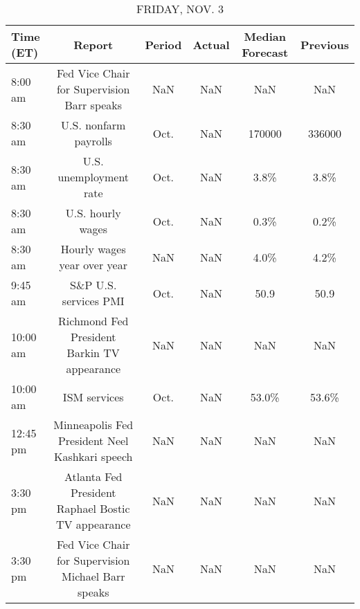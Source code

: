 \documentclass{article}%
\begin{document}
%


\begin{table}[htbp]%
\caption{FRIDAY, NOV. 3}%
\centering%
\begin{adjustbox}{width=1\textwidth}%
\begin{tabular}{lccccc}
\toprule
Time (ET) &                                             Report & Period & Actual & Median Forecast & Previous \\
\midrule
  8:00 am &         Fed Vice Chair for Supervision Barr speaks &    NaN &    NaN &             NaN &      NaN \\
  8:30 am &                              U.S. nonfarm payrolls &   Oct. &    NaN &          170000 &   336000 \\
  8:30 am &                             U.S. unemployment rate &   Oct. &    NaN &            3.8\% &     3.8\% \\
  8:30 am &                                  U.S. hourly wages &   Oct. &    NaN &            0.3\% &     0.2\% \\
  8:30 am &                        Hourly wages year over year &    NaN &    NaN &            4.0\% &     4.2\% \\
  9:45 am &                              S\&P U.S. services PMI &   Oct. &    NaN &            50.9 &     50.9 \\
 10:00 am &        Richmond Fed President Barkin TV appearance &    NaN &    NaN &             NaN &      NaN \\
 10:00 am &                                       ISM services &   Oct. &    NaN &           53.0\% &    53.6\% \\
 12:45 pm &     Minneapolis Fed President Neel Kashkari speech &    NaN &    NaN &             NaN &      NaN \\
  3:30 pm & Atlanta Fed President Raphael Bostic TV appearance &    NaN &    NaN &             NaN &      NaN \\
  3:30 pm & Fed Vice Chair for Supervision Michael Barr speaks &    NaN &    NaN &             NaN &      NaN \\
\bottomrule
\end{tabular}
%
\end{adjustbox}%
\end{table}
\end{document}
